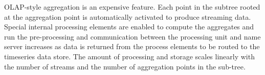 OLAP-style aggregation is an expensive feature.  Each point in the subtree rooted at the aggregation point is automatically
activated to produce streaming data.  Special internal processing elements are enabled to compute the aggregates and run
the pre-processing and communication between the processing unit and name server increases as data is returned from the 
process elements to be routed to the timeseries data store.  The amount of processing and storage scales linearly with the 
number of streams and the number of aggregation points in the sub-tree.







